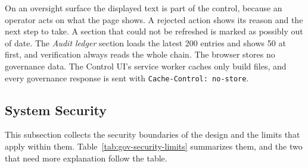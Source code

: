 On an oversight surface the displayed text is part of the control,
because an operator acts on what the page shows. A rejected action shows
its reason and the next step to take. A section that could not be
refreshed is marked as possibly out of date. The \textit{Audit ledger}
section loads the latest 200 entries and shows 50 at first, and
verification always reads the whole chain. The browser stores no
governance data. The Control UI's service worker caches only build files,
and every governance response is sent with \texttt{Cache-Control:
no-store}.

\subsection{System Security}
\label{sec:gov-security}

This subsection collects the security boundaries of the design and the
limits that apply within them. Table~\ref{tab:gov-security-limits}
summarizes them, and the two that need more explanation follow the table.

